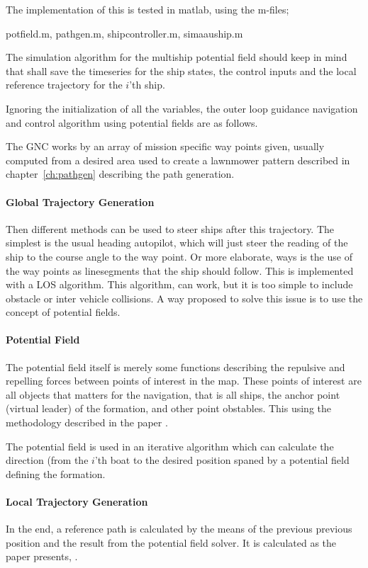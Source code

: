 The implementation of this is tested in matlab, using the m-files;

potfield.m, pathgen.m, shipcontroller.m, simaauship.m

The simulation algorithm for the multiship potential field should keep
in mind that shall save the timeseries for the ship states, the
control inputs and the local reference trajectory for the $i$'th ship.

Ignoring the initialization of all the variables, the outer loop
guidance navigation and control algorithm using potential fields are
as follows.

The \ac{GNC} works by an array of mission specific way points given,
usually computed from a desired area used to create a lawnmower
pattern described in chapter~\vref{ch:pathgen} describing the path
generation.

\paragraph{Global Trajectory Generation}
Then different methods can be used to steer ships after this
trajectory. The simplest is the usual heading autopilot, which will
just steer the reading of the ship to the course angle to the
way point. Or more elaborate, ways is the use of the way points as
linesegments that the ship should follow. This is implemented with a
\ac{LOS} algorithm. This algorithm, can work, but it is too simple to
include obstacle or inter vehicle collisions. A way proposed to solve
this issue is to use the concept of potential fields.

\paragraph{Potential Field}
The potential field itself is merely some functions describing the
repulsive and repelling forces between points of interest in the map.
These points of interest are all objects that matters for the
navigation, that is all ships, the anchor point (virtual leader) of
the formation, and other point obstables. This using the methodology
described in the paper \citep{UAVff3dpf}.

The potential field is used in an iterative algorithm which can
calculate the direction (from the $i$'th boat to the desired position
spaned by a potential field defining the formation.

\paragraph{Local Trajectory Generation}
In the end, a reference path is calculated by the means of the
previous previous position and the result from the potential field
solver. It is calculated as the paper presents, \citep[eq.
48]{UAVff3dpf}.


